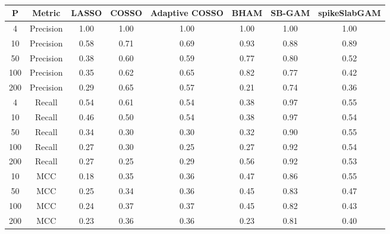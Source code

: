 \begin{table}[ht]
\centering
\begin{tabular}{cccccccc}
  \hline
P & Metric & LASSO & COSSO & Adaptive COSSO & BHAM & SB-GAM & spikeSlabGAM \\ 
  \hline
  4 & Precision & 1.00 & 1.00 & 1.00 & 1.00 & 1.00 & 1.00 \\ 
   10 & Precision & 0.58 & 0.71 & 0.69 & 0.93 & 0.88 & 0.89 \\ 
   50 & Precision & 0.38 & 0.60 & 0.59 & 0.77 & 0.80 & 0.52 \\ 
  100 & Precision & 0.35 & 0.62 & 0.65 & 0.82 & 0.77 & 0.42 \\ 
  200 & Precision & 0.29 & 0.65 & 0.57 & 0.21 & 0.74 & 0.36 \\ 
    4 & Recall & 0.54 & 0.61 & 0.54 & 0.38 & 0.97 & 0.55 \\ 
   10 & Recall & 0.46 & 0.50 & 0.54 & 0.38 & 0.97 & 0.54 \\ 
   50 & Recall & 0.34 & 0.30 & 0.30 & 0.32 & 0.90 & 0.55 \\ 
  100 & Recall & 0.27 & 0.30 & 0.25 & 0.27 & 0.92 & 0.54 \\ 
  200 & Recall & 0.27 & 0.25 & 0.29 & 0.56 & 0.92 & 0.53 \\ 
   10 & MCC & 0.18 & 0.35 & 0.36 & 0.47 & 0.86 & 0.55 \\ 
   50 & MCC & 0.25 & 0.34 & 0.36 & 0.45 & 0.83 & 0.47 \\ 
  100 & MCC & 0.24 & 0.37 & 0.37 & 0.45 & 0.82 & 0.43 \\ 
  200 & MCC & 0.23 & 0.36 & 0.36 & 0.23 & 0.81 & 0.40 \\ 
   \hline
\end{tabular}
\caption{} 
\label{tab:sim_binom_var_select}
\end{table}
